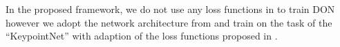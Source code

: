 In the proposed framework, we do not use any loss functions in
\parencites{florence2018dense}{florence2020dense}{kupcsik2021supervised}{adrian2022efficient}{hadjivelichkov2021fully}{nerf-Supervision} to train DON
however we adopt the network architecture from \cite{florence2018dense} and train on the task of the ``KeypointNet''\cite{suwajanakorn2018discovery}
with adaption of the loss functions proposed in \parencites{suwajanakorn2018discovery}{zhao2020learning}.